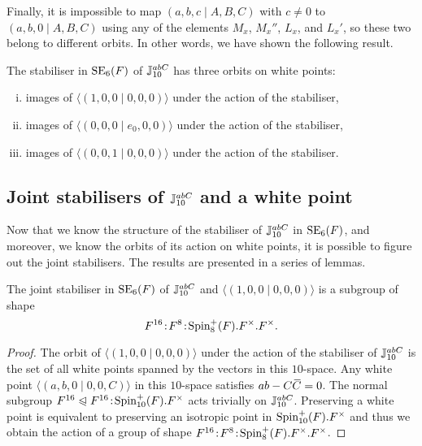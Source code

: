 Finally, it is impossible to map $(a,b,c\mid A,B,C)$ with $c \neq 0$ to $(a,b,0\mid A,B,C)$ using any of the
elements $M_x$, $M_x''$, $L_x$, and $L_x'$, so these two belong to different orbits. In other words, we have shown the following 
result.

\begin{theorem}
	\label{theorem:1_white_space_stab_orbits}
	The stabiliser in $\mathrm{SE}_6(F)$ of\phantom{;} $\mathbb{J}_{10}^{abC}$ has three orbits on white points:
	\begin{enumerate}[(i)]
		\item images of $\langle (1,0,0 \mid 0,0,0) \rangle $ under the action of the stabiliser,
		\item images of $\langle (0,0,0\mid e_0,0,0) \rangle$ under the action of the stabiliser,
		\item images of $\langle (0,0,1 \mid 0,0,0) \rangle$ under the action of the stabiliser.
	\end{enumerate}
\end{theorem}

\subsection{Joint stabilisers of $\mathbb{J}_{10}^{abC}$ and a white point}

Now that we know the structure of the stabiliser of $\mathbb{J}_{10}^{abC}$ in $\mathrm{SE}_6(F)$, and moreover, we know the orbits of 
its action on white points, it is possible to figure out the joint stabilisers. The results are presented in a series of lemmas.

\begin{lemma}
	\label{lemma:1_stab_joint_1}
	The joint stabiliser in $\mathrm{SE}_6(F)$ of\phantom{;} $\mathbb{J}_{10}^{abC}$ and $\langle (1,0,0 \mid 0,0,0) \rangle$ is a subgroup
	of shape 
	\begin{equation}
		F^{16}\mathord{{\;\!{:}\;\!}} F^8\mathord{{\;\!{:}\;\!}}\mathrm{Spin}_8^+(F).F^{\times}.F^{\times}.
	\end{equation}
\end{lemma}

\begin{proof}
	The orbit of $\langle (1,0,0 \mid 0,0,0) \rangle$ under the action of the stabiliser of $\mathbb{J}_{10}^{abC}$ is the set of all white points
	spanned by the vectors in this $10$-space. Any white point $\langle (a,b,0 \mid 0,0,C) \rangle$ in this $10$-space satisfies $ab - C\mathord{\mbox{\hspace*{0pt}}\,\overline{\!C\!\!\;}\!\:}\mbox{\hspace*{0pt}} = 0$. The
	normal subgroup 
\mbox{$F^{16} \trianglelefteqslant F^{16}\mathord{{\;\!{:}\;\!}}\mathrm{Spin}_{10}^+(F).F^{\times}$} acts trivially on $\mathbb{J}_{10}^{abC}$. Preserving a white point
	is equivalent to preserving an isotropic point in $\mathrm{Spin}_{10}^+(F).F^{\times}$ and thus we obtain the action of a group of shape $F^{16}\mathord{{\;\!{:}\;\!}} F^8\mathord{{\;\!{:}\;\!}}\mathrm{Spin}_8^+(F).F^{\times}.F^{\times}$.
\end{proof}

